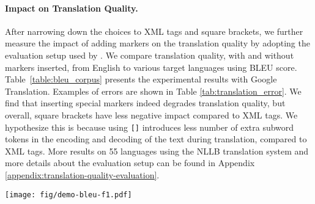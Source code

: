 \documentclass[11pt,dvipsnames]{article}
\newcommand*{\img}[1]{\raisebox{-.19\baselineskip}{\texttt{[image: \#1]}}}
\begin{document}
\paragraph{Impact on Translation Quality.} After narrowing down the choices to XML tags and square brackets, we further measure the impact of adding markers on the translation quality by adopting the evaluation setup used by \citet{fan2021beyond}. We compare translation quality, with and without markers inserted, from English to various target languages using  BLEU score. Table~\ref{table:bleu_corpus} presents the experimental results with Google Translation. Examples of errors are shown in Table \ref{tab:translation_error}.  We find that inserting special  markers indeed  degrades translation quality, but overall,  square brackets have less negative impact compared to XML tags.    We hypothesize this is because using \texttt{[]} introduces less number of extra subword tokens  in the encoding and decoding of the text during translation, compared to XML tags. More results on 55 languages using the NLLB  translation system and more details about the evaluation setup can be found in Appendix \ref{appendix:translation-quality-evaluation}. 













\begin{figure*}[t!]
    \centering
    \vspace{-5pt}
    \texttt{[image: fig/demo-bleu-f1.pdf]}
    \vspace{-25pt}
    \caption{Comparison of translation quality (x-axis) and end-task performance (y-axis) for different label projection methods on the WikiANN dataset using NLLB translation system. EasyProject\img{fig/dot-easyproject.png}(\S\ref{sec:easyproject_intro}) outperforms alignment-based approach\img{fig/dot-awesomealign.png}on F$_1$ scores for most languages, though inserting  markers degrades translation quality. The experimental setting is detailed in \S \ref{sec:comparsion_to_alignment}.}
    \label{fig:bleu_f1}
    \vspace{-15pt}
\end{figure*}
\end{document}

